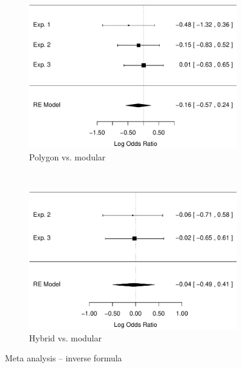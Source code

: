\documentclass[man,mask,10pt]{apa6}
\begin{document}
\begin{figure}
\centering
\begin{subfigure}[c]{0.4\textwidth}
\centering
\includegraphics[width=\textwidth]{figures/meta/question_typeinverse_formula_n_conditionpolygon.pdf}
\caption{Polygon vs. modular}
\end{subfigure}
~
\begin{subfigure}[c]{0.4\textwidth}
\centering
\includegraphics[width=\textwidth]{figures/meta/question_typeinverse_formula_n_conditionhybrid.pdf}
\caption{Hybrid vs. modular}
\end{subfigure}
\caption{Meta analysis -- inverse formula}
\label{meta_in_f}
\end{figure}\noindent 
\end{document}
